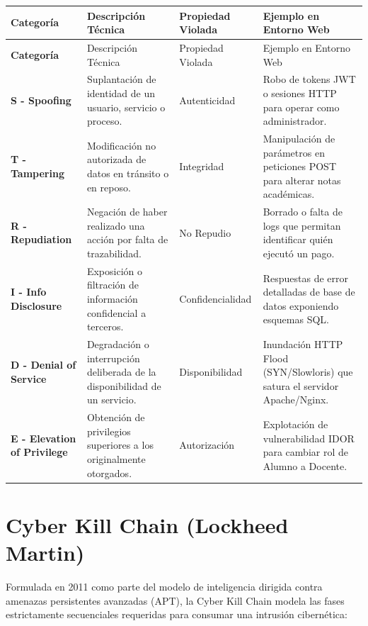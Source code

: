 \begin{center}
\small
\begin{longtable}{>{\bfseries}p{2.8cm} p{4.2cm} p{3.2cm} p{4.2cm}}
\toprule
\rowcolor{outermarginbgcolor}
Categoría & Descripción Técnica & Propiedad Violada & Ejemplo en Entorno Web \\
\midrule
\endfirsthead
\toprule
\rowcolor{outermarginbgcolor}
Categoría & Descripción Técnica & Propiedad Violada & Ejemplo en Entorno Web \\
\midrule
\endhead
\bottomrule
\endfoot
S - Spoofing & Suplantación de identidad de un usuario, servicio o proceso. & Autenticidad & Robo de tokens JWT o sesiones HTTP para operar como administrador. \\
\midrule
T - Tampering & Modificación no autorizada de datos en tránsito o en reposo. & Integridad & Manipulación de parámetros en peticiones POST para alterar notas académicas. \\
\midrule
R - Repudiation & Negación de haber realizado una acción por falta de trazabilidad. & No Repudio & Borrado o falta de logs que permitan identificar quién ejecutó un pago. \\
\midrule
I - Info Disclosure & Exposición o filtración de información confidencial a terceros. & Confidencialidad & Respuestas de error detalladas de base de datos exponiendo esquemas SQL. \\
\midrule
D - Denial of Service & Degradación o interrupción deliberada de la disponibilidad de un servicio. & Disponibilidad & Inundación HTTP Flood (SYN/Slowloris) que satura el servidor Apache/Nginx. \\
\midrule
E - Elevation of Privilege & Obtención de privilegios superiores a los originalmente otorgados. & Autorización & Explotación de vulnerabilidad IDOR para cambiar rol de Alumno a Docente. \\
\bottomrule
\end{longtable}
\end{center}

\section{Cyber Kill Chain (Lockheed Martin)}
Formulada en 2011 como parte del modelo de inteligencia dirigida contra amenazas persistentes avanzadas (APT), la Cyber Kill Chain modela las fases estrictamente secuenciales requeridas para consumar una intrusión cibernética:

